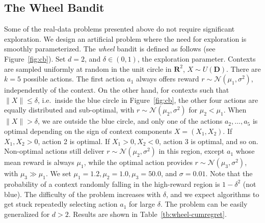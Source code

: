 \documentclass{article} \usepackage{iclr2018_conference,times}
\begin{document}
\subsection{The Wheel Bandit}
Some of the real-data problems presented above do not require significant exploration.
We design an artificial problem where the need for exploration is smoothly parameterized.
The \emph{wheel} bandit is defined as follows (see Figure~\ref{fig:cb}).
Set $d = 2$, and $\delta \in (0, 1)$, the exploration parameter.
Contexts are sampled uniformly at random in the unit circle in $\mathbf{R}^2$, $X \sim U(\mathbf{D})$.
There are $k = 5$ possible actions.
The first action $a_1$ always offers reward $r \sim \mathcal{N}(\mu_1, \sigma^2)$, independently of the context.
On the other hand, for contexts such that $\| X \| \le \delta$, i.e.\ inside the blue circle in Figure~\ref{fig:cb}, the other four actions are equally distributed and sub-optimal, with $r \sim \mathcal{N}(\mu_2, \sigma^2)$ for $\mu_2 < \mu_1$.
When $\| X \| > \delta$, we are outside the blue circle, and only one of the actions $a_2, \dots, a_5$ is optimal depending on the sign of context components $X = (X_1, X_2)$.
If $X_1, X_2 > 0$, action 2 is optimal.
If $X_1 > 0, X_2 < 0$, action 3 is optimal, and so on.
Non-optimal actions still deliver $r \sim \mathcal{N}(\mu_2, \sigma^2)$ in this region, except $a_1$ whose mean reward is always $\mu_1$, while the optimal action provides $r \sim \mathcal{N}(\mu_3, \sigma^2)$, with $\mu_3 \gg \mu_1$.
We set $\mu_1 = 1.2, \mu_2 = 1.0, \mu_3 = 50.0$, and $\sigma = 0.01$.
Note that the probability of a context randomly falling in the high-reward region is $1 - \delta^2$ (not blue).
The difficulty of the problem increases with $\delta$, and we expect algorithms to get stuck repeatedly selecting action $a_1$ for large $\delta$.
The problem can be easily generalized for $d > 2$.
Results are shown in Table~\ref{tb:wheel-cumregret}. 
\end{document}
